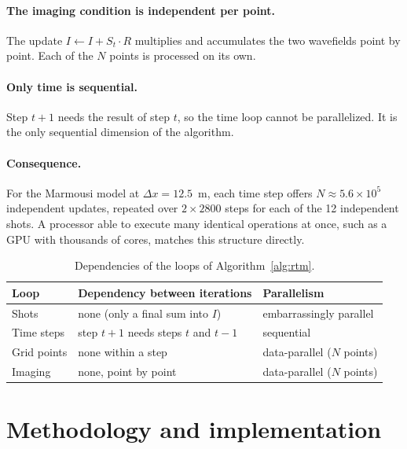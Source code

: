 \documentclass[letterpaper,11pt,leqno]{article}
\begin{document}
\paragraph{The imaging condition is independent per point.}
The update $I \gets I + S_t \cdot R$ multiplies and accumulates the two
wavefields point by point. Each of the $N$ points is processed on its own.

\paragraph{Only time is sequential.}
Step $t+1$ needs the result of step $t$, so the time loop cannot be
parallelized. It is the only sequential dimension of the algorithm.

\paragraph{Consequence.}
For the Marmousi model at $\Delta x = 12.5$~m, each time step offers
$N \approx 5.6 \times 10^{5}$ independent updates, repeated over
$2\times 2800$ steps for each of the 12 independent shots. A processor
able to execute many identical operations at once, such as a GPU with
thousands of cores, matches this structure directly.

\begin{table}[htbp]
\centering
\caption{Dependencies of the loops of Algorithm~\ref{alg:rtm}.}
\label{tab:rtm-parallelism}
\begin{tabular}{lll}
\toprule
Loop          & Dependency between iterations          & Parallelism \\
\midrule
Shots         & none (only a final sum into $I$)       & embarrassingly parallel \\
Time steps    & step $t+1$ needs steps $t$ and $t-1$   & sequential \\
Grid points   & none within a step                     & data-parallel ($N$ points) \\
Imaging       & none, point by point                   & data-parallel ($N$ points) \\
\bottomrule
\end{tabular}
\end{table}

\section{Methodology and implementation}\label{s:methodology}
\end{document}

